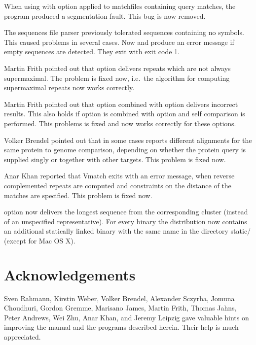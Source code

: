 \documentclass[12pt,titlepage]{article}
\begin{document}
\begin{AboutVmatch}
When using \VMS with option  applied to matchfiles 
containing query matches, the program produced a segmentation fault.
This bug is now removed.

The sequences file parser previously tolerated sequences containing
no symbols. This caused problems in several cases. Now \MKV and 
\VM produce an error message if empty sequences are detected.
They exit with exit code 1.

Martin Frith pointed out that option  delivers
repeats which are not always supermaximal. The problem is fixed now,
i.e.\ the algorithm for computing supermaximal repeats now works correctly.

Martin Frith pointed out that option  combined with option
 delivers incorrect results. This also holds if
option  is combined with option  and
self comparison is performed. This problems is fixed and \VM now works
correctly for these options.

Volker Brendel pointed out that in some cases
\VM reports different alignments for the same protein to genome
comparison, depending on whether the protein query is supplied singly
or together with other targets. This problem is fixed now.

Anar Khan reported that Vmatch exits with an error message, when
reverse complemented repeats are computed and constraints on the
distance of the matches are specified. This problem is fixed now.

option  now delivers the longest sequence
from the corresponding cluster (instead of an unspecified representative).
For every binary the distribution now contains an additional statically linked
binary with the same name in the directory static/ (except for Mac OS X).
\end{AboutVmatch}

\section*{Acknowledgements}
Sven Rahmann,
Kirstin Weber,
Volker Brendel,
Alexander Sczyrba,
Jomuna Choudhuri, 
Gordon Gremme, 
Marisano James, 
Martin Frith,
Thomas Jahns, 
Peter Andrews,
Wei Zhu,
Anar Khan, and
Jeremy Leipzig
gave valuable hints on improving the manual and the
programs described herein. Their help is much appreciated.
\end{document}
